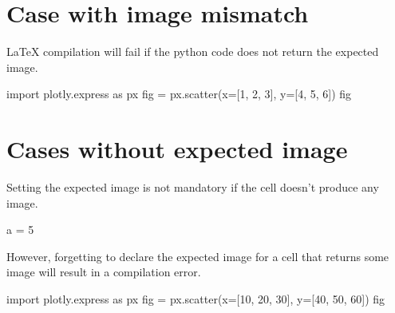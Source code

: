 \documentclass[oneside]{book}
\begin{document}
\chapter{Case with image mismatch}

LaTeX compilation will fail if the python code does not return the expected image.

\begin{pycell}
import plotly.express as px
fig = px.scatter(x=[1, 2, 3], y=[4, 5, 6])
fig
\end{pycell}

\chapter{Cases without expected image}

Setting the expected image is not mandatory if the cell doesn't produce any image.

\begin{pycell}
a = 5
\end{pycell}

However, forgetting to declare the expected image for a cell that returns some image will result in a compilation error.
\begin{pycell}
import plotly.express as px
fig = px.scatter(x=[10, 20, 30], y=[40, 50, 60])
fig
\end{pycell}

\ifPythonTeXLoaded
\else
\fi
\end{document}
